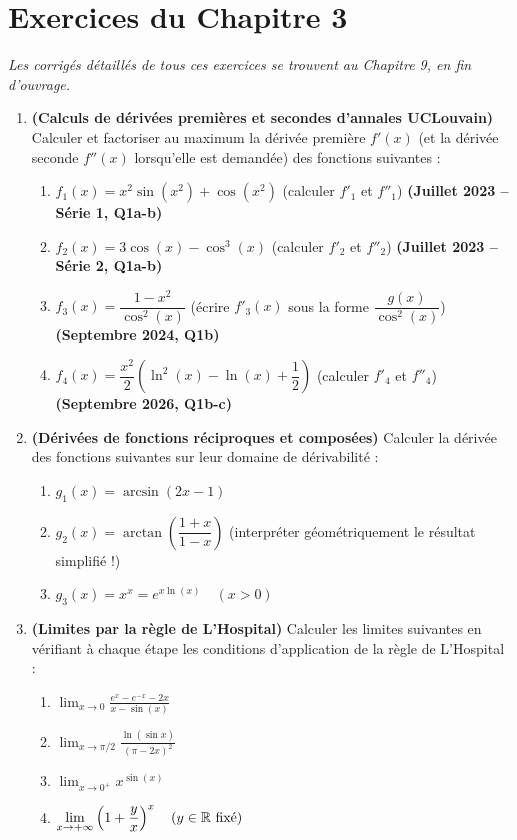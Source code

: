 \section{Exercices du Chapitre 3}

\emph{Les corrigés détaillés de tous ces exercices se trouvent au Chapitre 9, en fin d'ouvrage.}

\begin{enumerate}[label=\textbf{Exercice 3.\arabic* --}]
    \item \textbf{(Calculs de dérivées premières et secondes d'annales UCLouvain)} Calculer et factoriser au maximum la dérivée première $f'(x)$ (et la dérivée seconde $f''(x)$ lorsqu'elle est demandée) des fonctions suivantes :
    \begin{enumerate}
        \item $f_1(x) = x^2\sin(x^2) + \cos(x^2)$ \quad (calculer $f'_1$ et $f''_1$) \quad \textbf{(Juillet 2023 -- Série 1, Q1a-b)}
        \item $f_2(x) = 3\cos(x) - \cos^3(x)$ \quad (calculer $f'_2$ et $f''_2$) \quad \textbf{(Juillet 2023 -- Série 2, Q1a-b)}
        \item $f_3(x) = \dfrac{1 - x^2}{\cos^2(x)}$ \quad (écrire $f'_3(x)$ sous la forme $\dfrac{g(x)}{\cos^2(x)}$) \quad \textbf{(Septembre 2024, Q1b)}
        \item $f_4(x) = \dfrac{x^2}{2}\left(\ln^2(x) - \ln(x) + \dfrac{1}{2}\right)$ \quad (calculer $f'_4$ et $f''_4$) \quad \textbf{(Septembre 2026, Q1b-c)}
    \end{enumerate}

    \item \textbf{(Dérivées de fonctions réciproques et composées)} Calculer la dérivée des fonctions suivantes sur leur domaine de dérivabilité :
    \begin{enumerate}
        \item $g_1(x) = \arcsin(2x - 1)$
        \item $g_2(x) = \arctan\left(\dfrac{1+x}{1-x}\right)$ \quad (interpréter géométriquement le résultat simplifié !)
        \item $g_3(x) = x^x = e^{x\ln(x)} \quad (x > 0)$
    \end{enumerate}

    \item \textbf{(Limites par la règle de L'Hospital)} Calculer les limites suivantes en vérifiant à chaque étape les conditions d'application de la règle de L'Hospital :
    \begin{enumerate}
        \item $\displaystyle \lim_{x \to 0} \frac{e^x - e^{-x} - 2x}{x - \sin(x)}$
        \item $\displaystyle \lim_{x \to \pi/2} \frac{\ln(\sin x)}{(\pi - 2x)^2}$
        \item $\displaystyle \lim_{x \to 0^+} x^{\sin(x)}$
        \item $\displaystyle \lim_{x \to +\infty} \left(1 + \frac{y}{x}\right)^x \quad (y \in \mathbb{R} \text{ fixé})$
    \end{enumerate}


\end{enumerate}
